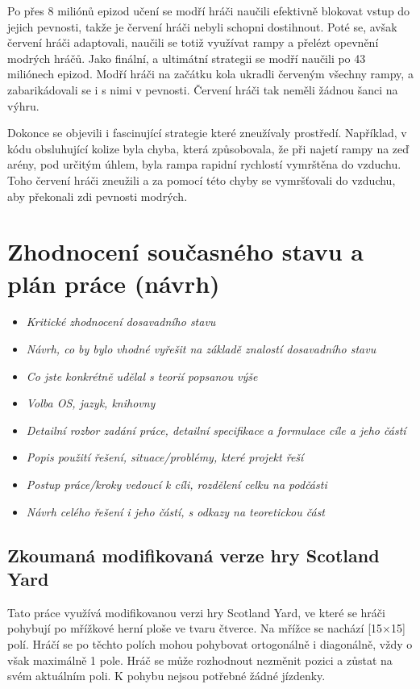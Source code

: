 Po přes 8 miliónů epizod učení se modří hráči naučili efektivně blokovat vstup do jejich pevnosti, takže je červení hráči nebyli schopni dostihnout.
Poté se, avšak červení hráči adaptovali, naučili se totiž využívat rampy a přelézt opevnění modrých hráčů.
Jako finální, a ultimátní strategii se modří naučili po 43 miliónech epizod.
Modří hráči na začátku kola ukradli červeným všechny rampy, a zabarikádovali se i s nimi v pevnosti.
Červení hráči tak neměli žádnou šanci na výhru.

Dokonce se objevili i fascinující strategie které zneužívaly prostředí.
Například, v kódu obsluhující kolize byla chyba, která způsobovala, že při najetí rampy na zeď arény, pod určitým úhlem, byla rampa rapidní rychlostí vymrštěna do vzduchu.
Toho červení hráči zneužili a za pomocí této chyby se vymršťovali do vzduchu, aby překonali zdi pevnosti modrých.

\chapter{Zhodnocení současného stavu a plán práce (návrh)}
\label{ch:navrh}
\begin{itemize}
  \item \emph {Kritické zhodnocení dosavadního stavu}
  \item \emph {Návrh, co by bylo vhodné vyřešit na základě znalostí dosavadního stavu}
  \item \emph {Co jste konkrétně udělal s teorií popsanou výše}
  \item \emph {Volba OS, jazyk, knihovny}
  \item \emph {Detailní rozbor zadání práce, detailní specifikace a formulace cíle a jeho částí}
  \item \emph {Popis použití řešení, situace/problémy, které projekt řeší}
  \item \emph {Postup práce/kroky vedoucí k cíli, rozdělení celku na podčásti}
  \item \emph {Návrh celého řešení i jeho částí, s odkazy na teoretickou část}
\end{itemize}

\section{Zkoumaná modifikovaná verze hry Scotland Yard}\label{sec:zkoumana-modifikovana-verze-hry-scotland-yard}

Tato práce využívá modifikovanou verzi hry Scotland Yard, ve které se hráči pohybují po mřížkové herní ploše ve tvaru čtverce.
Na mřížce se nachází {\color{red}[15$\times$15]} polí.
Hráčí se po těchto polích mohou pohybovat ortogonálně i diagonálně, vždy o však maximálně 1 pole.
Hráč se může rozhodnout nezměnit pozici a zůstat na svém aktuálním poli.
K pohybu nejsou potřebné žádné jízdenky.

